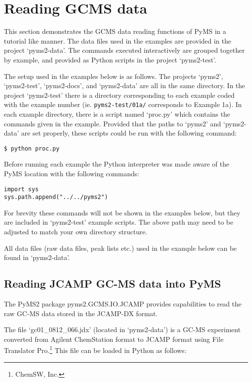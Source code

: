 \section{Reading GCMS data}

This section demonstrates the GCMS data reading functions of PyMS in a tutorial
like manner. The data files used in the examples are provided in the project
`pyms2-data'. The commands executed interactively are grouped together by
example, and provided as Python scripts in the project `pyms2-test'.

The setup used in the examples below is as follows. The projects `pyms2',
`pyms2-test', `pyms2-docs', and `pyms2-data' are all in the same directory. In
the project `pyms2-test' there is a directory corresponding to each example
coded with the example number (ie. {\tt pyms2-test/01a/} corresponds to Example
1a). In each example directory, there is a script named `proc.py' which contains
the commands given in the example. Provided that the paths to `pyms2' and
`pyms2-data' are set properly, these scripts could be run with the following
command:

\begin{verbatim}
$ python proc.py
\end{verbatim}

Before running each example the Python interpreter was made aware of the
PyMS location with the following commands:

\begin{verbatim}
import sys
sys.path.append("../../pyms2")
\end{verbatim}

For brevity these commands will not be shown in the examples below, but
they are included in `pyms2-test' example scripts.  The above path may need
to be adjusted to match your own directory structure.

All data files (raw data files, peak lists etc.) used in the example below
can be found in `pyms2-data'.

\subsection{Reading JCAMP GC-MS data into PyMS}


The PyMS2 package pyms2.GCMS.IO.JCAMP provides capabilities to read the raw
GC-MS data stored in the JCAMP-DX format.

The file `gc01\_0812\_066.jdx' (located in `pyms2-data') is a GC-MS experiment
converted from Agilent ChemStation format to JCAMP format using File Translator
Pro.\footnote{ChemSW, Inc.} This file can be loaded in Python as follows:

